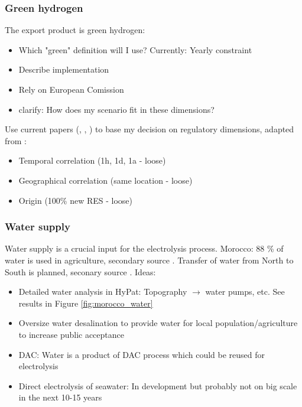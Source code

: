\subsubsection{Green hydrogen}
The export product is green hydrogen:
\begin{itemize}
    \item Which "green" definition will I use? Currently: Yearly constraint
    \item Describe implementation
    \item Rely on European Comission
    \item clarify: How does my scenario fit in these dimensions?
\end{itemize}

Use current papers (\cite{Brauer2022}, \cite{Ruhnau2022}, \cite{Zeyen2022}) to base my decision on
regulatory dimensions, adapted from \cite{Brauer2022}:
\begin{itemize}
    \item Temporal correlation (1h, 1d, 1a - loose) 
    \item Geographical correlation (same location - loose)
    \item Origin (100\% new RES - loose)
\end{itemize}


\subsubsection{Water supply}
\label{subsec:water_supply}
Water supply is a crucial input for the electrolysis process. 
Morocco: 88 \% of water is used in agriculture, secondary source \cite{Ersoy2022}.
Transfer of water from North to South is planned, seconary source \cite{Ersoy2022}.
Ideas:
\begin{itemize}
    \item Detailed water analysis in HyPat: Topography $\rightarrow$ water pumps, etc. See results in Figure \ref{fig:morocco_water}
    \item Oversize water desalination to provide water for local population/agriculture to increase public acceptance
    \item DAC: Water is a product of DAC process which could be reused for electrolysis
    \item Direct electrolysis of seawater: In development but probably not on big scale in the next 10-15 years
\end{itemize}



